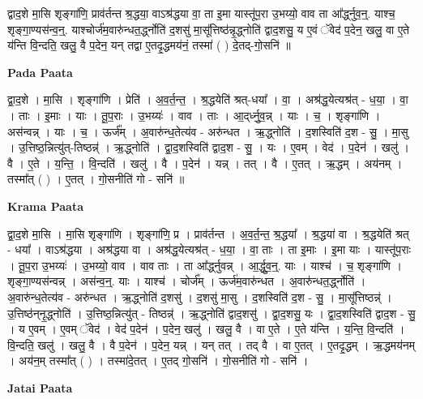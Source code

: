 \documentclass[17pt]{extarticle}
\begin{document}
द्वाद॒शे मा॒सि शृङ्गा॑णि॒ प्राव॑र्तन्त श्र॒द्धया॒ वाऽश्र॑द्धया वा॒ ता इ॒मा यास्तू॑प॒रा उ॒भय्यो॒ वाव ता आ᳚र्द्ध्नुव॒न्॒. याश्च॒ शृङ्गा॒ण्यस॑न्व॒न्॒. याश्चोर्ज॑म॒वारु॑न्धत॒र्द्ध्नोति॑ द॒शसु॑ मा॒सू᳚त्तिष्ठ॑न्नृ॒द्ध्नोति॑ द्वाद॒शसु॒ य ए॒वं ॅवेद॑ प॒देन॒ खलु॒ वा ए॒ते य॑न्ति वि॒न्दति॒ खलु॒ वै प॒देन॒ यन् तद्वा ए॒तदृ॒द्धमय॑नं॒ तस्मा॑ ( ) दे॒तद्-गो॒सनि॑ ॥ \newline

\textbf{Pada Paata} \newline

द्वा॒द॒शे । मा॒सि । शृङ्गा॑णि । प्रेति॑ । अ॒व॒र्त॒न्त॒ । श्र॒द्धयेति॑ श्रत्-धया᳚ । वा॒ । अश्र॑द्ध॒येत्यश्र॑त् - ध॒या॒ । वा॒ । ताः । इ॒माः । याः । तू॒प॒राः । उ॒भय्यः॑ । वाव । ताः । आ॒द्‌र्ध्नु॒व॒न्न् । याः । च॒ । शृङ्गा॑णि । अस॑न्वन्न् । याः । च॒ । ऊर्ज᳚म् । अ॒वारु॑न्ध॒तेत्य॑व - अरु॑न्धत । ऋ॒द्ध्नोति॑ । द॒शस्विति॑ द॒श - सु॒ । मा॒सु । उ॒त्तिष्ठ॒न्नित्यु॑त्-तिष्ठन्न्॑ । ऋ॒द्ध्नोति॑ । द्वा॒द॒शस्विति॑ द्वाद॒श - सु॒ । यः । ए॒वम् । वेद॑ । प॒देन॑ । खलु॑ । वै । ए॒ते । य॒न्ति॒ । वि॒न्दति॑ । खलु॑ । वै । प॒देन॑ । यन्न् । तत् । वै । ए॒तत् । ऋ॒द्धम् । अय॑नम् । तस्मा᳚त् ( ) । ए॒तत् । गो॒सनीति॑ गो - सनि॑ ॥  \newline


\textbf{Krama Paata} \newline

द्वा॒द॒शे मा॒सि । मा॒सि शृङ्‍गा॑णि । शृङ्‍गा॑णि॒ प्र । प्राव॑र्तन्त । अ॒व॒र्त॒न्त॒ श्र॒द्धया᳚ । श्र॒द्धया॑ वा । श्र॒द्धयेति॑ श्रत् - धया᳚ । वाऽश्र॑द्धया । अश्र॑द्धया वा । अश्र॑द्ध॒येत्यश्र॑त् - ध॒या॒ । वा॒ ताः । ता इ॒माः । इ॒मा याः । यास्तू॑प॒राः । तू॒प॒रा उ॒भय्यः॑ । उ॒भय्यो॒ वाव । वाव ताः । ता आ᳚र्द्ध्नुवन्न् । आ॒र्द्धु॒व॒न्॒. याः । याश्च॑ । 
च॒ शृङ्‍गा॑णि । शृङ्‍गा॒ण्यस॑न्वन्न् । अस॑न्व॒न्॒. याः । याश्च॑ । चोर्ज᳚म् । ऊर्ज॑म॒वारु॑न्धत । अ॒वारु॑न्धत॒र्द्ध्नोति॑ । अ॒वारु॑न्ध॒तेत्य॑व - अरु॑न्धत । ऋ॒द्ध्नोति॑ द॒शसु॑ । द॒शसु॑ मा॒सु । द॒शस्विति॑ द॒श - सु॒ । मा॒सू᳚त्तिष्ठन्न्॑ । उ॒त्तिष्ठ॑न्‌नृ॒द्ध्नोति॑ । उ॒त्तिष्ठ॒न्नित्यु॑त् - तिष्ठन्न्॑ । ऋ॒द्ध्नोति॑ द्वाद॒शसु॑ । द्वा॒द॒शसु॒ यः । द्वा॒द॒शस्विति॑ द्वाद॒श - सु॒ । य ए॒वम् । ए॒वम् ॅवेद॑ । वेद॑ प॒देन॑ । प॒देन॒ खलु॑ । खलु॒ वै । वा ए॒ते । ए॒ते य॑न्ति । य॒न्ति॒ वि॒न्दति॑ । वि॒न्दति॒ खलु॑ । खलु॒ वै । वै प॒देन॑ । प॒देन॒ यन्न् । यन् तत् । तद् वै । वा ए॒तत् । ए॒तदृ॒द्धम् । ऋ॒द्धमय॑नम् । अय॑न॒म् तस्मा᳚त् ( ) । तस्मा॑दे॒तत् । ए॒तद् गो॒सनि॑ । गो॒सनीति॑ गो - सनि॑ । \newline

\textbf{Jatai Paata} \newline
\end{document}
